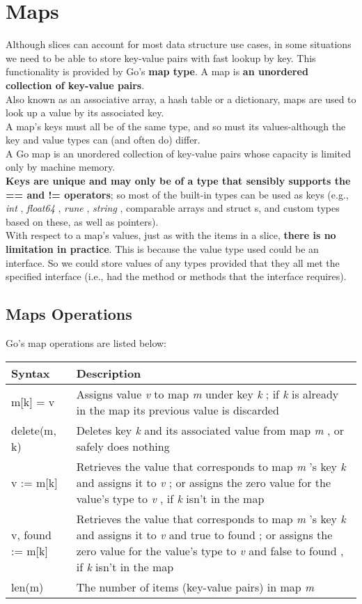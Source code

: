 \documentclass[10pt,letterpaper]{report}
\begin{document}
\section{Maps}
Although slices can account for most data structure use cases, in some situations we need to be able to store key-value pairs with fast lookup by key. This functionality is provided by Go's \textbf{map type}. A map is \textbf{an unordered collection of key-value pairs}.\\
Also known as an associative array, a hash table or a dictionary, maps are used to look up a value by its associated key.\\
A map's keys must all be of the same type, and so must its values-although the key and value types can (and often do) differ.\\
A Go map is an unordered collection of key-value pairs whose capacity is limited only by machine memory.\\
\textbf{Keys are unique and may only be of a type that sensibly supports the == and != operators}; so most of the built-in types can be used as keys (e.g., \textit{int} , \textit{float64} , \textit{rune} , \textit{string} , comparable arrays and struct s, and custom types based on these, as well as pointers).\\
With respect to a map's values, just as with the items in a slice, \textbf{there is no limitation in practice}. This is because the value type used could be an interface. So we could store values of any types provided that they all met the specified interface (i.e., had the method or methods that the interface requires).
\subsection{Maps Operations}
Go's map operations are listed below:\\
\begin{tabular}{|l|p{10cm}|}
\hline
Syntax & Description\\ \hline
m[k] = v & Assigns value \textit{v} to map \textit{m} under key \textit{k} ; if \textit{k} is already in the map its previous value is discarded\\ \hline
delete(m, k) & Deletes key \textit{k} and its associated value from map \textit{m} , or safely does nothing\\ \hline
v := m[k] & Retrieves the value that corresponds to map \textit{m} 's key \textit{k} and assigns it to \textit{v} ; or assigns the zero value for the value's type to \textit{v} , if \textit{k} isn't in the map\\ \hline
v, found := m[k] & Retrieves the value that corresponds to map \textit{m} 's key \textit{k} and assigns it to \textit{v} and true to found ; or assigns the zero value for the value's type to \textit{v} and false to found , if \textit{k} isn't in the map\\ \hline
len(m) & The number of items (key-value pairs) in map \textit{m}\\ \hline
\end{tabular}
\\
\end{document}
